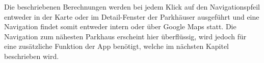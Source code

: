 Die beschriebenen Berechnungen werden bei jedem Klick auf den Navigationspfeil entweder in der Karte oder im Detail-Fenster der Parkhäuser ausgeführt und eine Navigation findet somit entweder intern oder über Google Maps statt. Die Navigation zum nähesten Parkhaus erscheint hier überflüssig, wird jedoch für eine zusätzliche Funktion der App benötigt, welche im nächsten Kapitel beschrieben wird.
